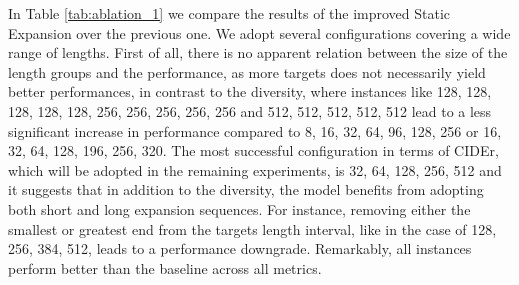 In Table \ref{tab:ablation_1} we compare the results of the improved Static Expansion over the previous one. We adopt seve\-ral configurations covering a wide range of lengths. First of all, there is no apparent relation between the size of the length groups and the performance, as more targets does not necessarily yield better performances, in contrast to the diversity, where instances like 128, 128, 128, 128, 128, 256, 256, 256, 256, 256 and 512, 512, 512, 512, 512 lead to a less significant increase in performance compared to 8, 16, 32, 64, 96, 128, 256 or 16, 32, 64, 128, 196, 256, 320. The most successful configuration in terms of CIDEr, which will be adopted in the remaining experiments, is 32, 64, 128, 256, 512  and it suggests that in addition to the diversity, the model benefits from adopting both short and long expansion sequences. For instance, removing either the smallest or greatest end from the targets length interval, like in the case of 128, 256, 384, 512, leads to a performance downgrade. Remarkably, all instances perform better than the baseline across all metrics.


